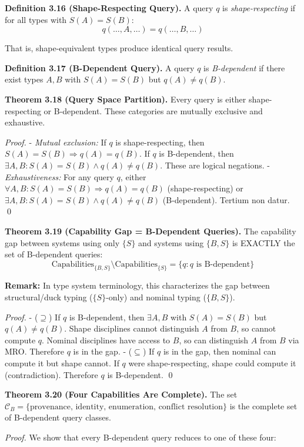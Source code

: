 \textbf{Definition 3.16 (Shape-Respecting Query).} A query \(q\) is
\emph{shape-respecting} if for all types with \(S(A) = S(B)\):
\[q(\ldots, A, \ldots) = q(\ldots, B, \ldots)\]

That is, shape-equivalent types produce identical query results.

\textbf{Definition 3.17 (B-Dependent Query).} A query \(q\) is
\emph{B-dependent} if there exist types \(A, B\) with \(S(A) = S(B)\)
but \(q(A) \neq q(B)\).

\textbf{Theorem 3.18 (Query Space Partition).} Every query is either
shape-respecting or B-dependent. These categories are mutually exclusive
and exhaustive.

\emph{Proof.} - \emph{Mutual exclusion:} If \(q\) is shape-respecting,
then \(S(A) = S(B) \Rightarrow q(A) = q(B)\). If \(q\) is B-dependent,
then \(\exists A, B: S(A) = S(B) \land q(A) \neq q(B)\). These are
logical negations. - \emph{Exhaustiveness:} For any query \(q\), either
\(\forall A, B: S(A) = S(B) \Rightarrow q(A) = q(B)\) (shape-respecting)
or \(\exists A, B: S(A) = S(B) \land q(A) \neq q(B)\) (B-dependent).
Tertium non datur. \qed

\textbf{Theorem 3.19 (Capability Gap = B-Dependent Queries).} The
capability gap between systems using only $\{S\}$ and systems using $\{B, S\}$ is EXACTLY the set of
B-dependent queries:
\[\text{Capabilities}_{\{B,S\}} \setminus \text{Capabilities}_{\{S\}} = \{q : q \text{ is B-dependent}\}\]

\textbf{Remark:} In type system terminology, this characterizes the gap between structural/duck typing ($\{S\}$-only) and nominal typing ($\{B, S\}$).

\emph{Proof.} - (\(\supseteq\)) If \(q\) is B-dependent, then
\(\exists A, B\) with \(S(A) = S(B)\) but \(q(A) \neq q(B)\). Shape
disciplines cannot distinguish \(A\) from \(B\), so cannot compute
\(q\). Nominal disciplines have access to \(B\), so can distinguish
\(A\) from \(B\) via MRO. Therefore \(q\) is in the gap. -
(\(\subseteq\)) If \(q\) is in the gap, then nominal can compute it but
shape cannot. If \(q\) were shape-respecting, shape could compute it
(contradiction). Therefore \(q\) is B-dependent. \qed

\textbf{Theorem 3.20 (Four Capabilities Are Complete).} The set
\(\mathcal{C}_B = \{\text{provenance, identity, enumeration, conflict resolution}\}\)
is the complete set of B-dependent query classes.

\emph{Proof.} We show that every B-dependent query reduces to one of
these four:

